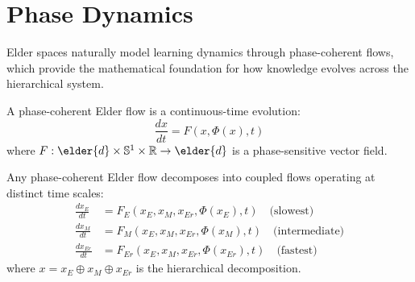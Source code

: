 \section{Phase Dynamics}

Elder spaces naturally model learning dynamics through phase-coherent flows, which provide the mathematical foundation for how knowledge evolves across the hierarchical system.

\begin{definition}
\label{def:phase_coherent_flow}
A phase-coherent Elder flow is a continuous-time evolution:
\begin{equation}
\frac{dx}{dt} = F(x, \Phi(x), t)
\end{equation}
where $F: \elder{d} \times \mathbb{S}^1 \times \mathbb{R} \rightarrow \elder{d}$ is a phase-sensitive vector field.
\end{definition}

\begin{theorem}
\label{thm:elder-flow-decomposition}
Any phase-coherent Elder flow decomposes into coupled flows operating at distinct time scales:
\begin{align}
\frac{dx_E}{dt} &= F_E(x_E, x_M, x_{Er}, \Phi(x_E), t) \quad \text{(slowest)}\\
\frac{dx_M}{dt} &= F_M(x_E, x_M, x_{Er}, \Phi(x_M), t) \quad \text{(intermediate)}\\
\frac{dx_{Er}}{dt} &= F_{Er}(x_E, x_M, x_{Er}, \Phi(x_{Er}), t) \quad \text{(fastest)}
\end{align}
where $x = x_E \oplus x_M \oplus x_{Er}$ is the hierarchical decomposition.
\end{theorem}

